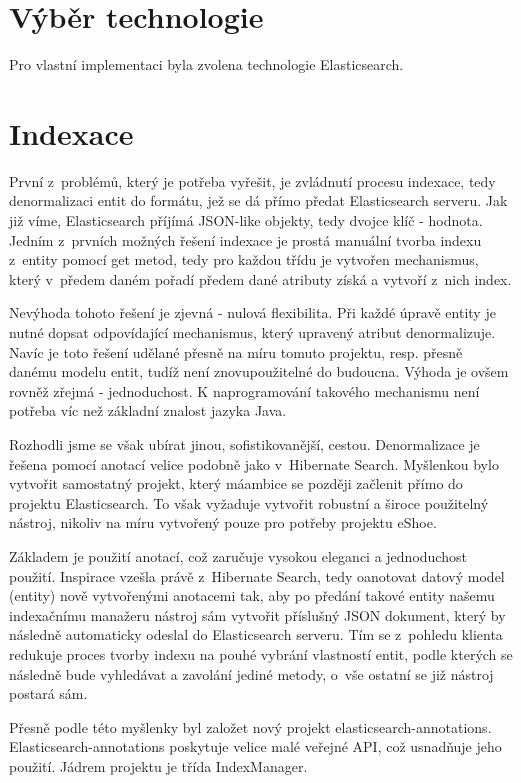 \documentclass[11pt,oneside]{fithesis2}
\begin{document}
\section{Výběr technologie}
Pro vlastní implementaci byla zvolena technologie Elasticsearch. 

\section{Indexace}
První z~problémů, který je potřeba vyřešit, je zvládnutí procesu indexace, tedy denormalizaci entit do formátu, jež se dá přímo předat Elasticsearch serveru. Jak již víme, Elasticsearch příjímá JSON-like objekty,
tedy dvojce klíč - hodnota.
Jedním z~prvních možných řešení indexace je prostá manuální tvorba indexu z~entity pomocí get metod, tedy pro každou třídu je vytvořen mechanismus, který v~předem daném pořadí předem dané atributy získá a vytvoří z~nich index.

Nevýhoda tohoto řešení je zjevná - nulová flexibilita. Při každé úpravě entity je nutné dopsat odpovídající mechanismus, který upravený atribut denormalizuje. Navíc je toto řešení udělané přesně na míru tomuto projektu, resp. přesně danému modelu entit,
tudíž není znovupoužitelné do budoucna. Výhoda je ovšem rovněž zřejmá - jednoduchost. K naprogramování takového mechanismu není potřeba víc než základní znalost jazyka Java.

Rozhodli jsme se však ubírat jinou, sofistikovanější, cestou. Denormalizace je řešena pomocí anotací velice podobně jako v~Hibernate Search. Myšlenkou bylo vytvořit samostatný projekt, který máambice se později začlenit přímo do projektu
Elasticsearch. To však vyžaduje vytvořit robustní a široce použitelný nástroj, nikoliv na míru vytvořený pouze pro potřeby projektu eShoe. 

Základem je použití anotací, což zaručuje vysokou eleganci a jednoduchost použití. Inspirace vzešla právě z~Hibernate Search, tedy oanotovat datový model (entity) nově vytvořenými anotacemi tak, aby po předání takové entity našemu indexačnímu manažeru
nástroj sám vytvořit příslušný JSON dokument, který by následně automaticky odeslal do Elasticsearch serveru. Tím se z~pohledu klienta redukuje proces tvorby indexu na pouhé vybrání vlastností entit, podle kterých se následně bude vyhledávat a
zavolání jediné metody, o~vše ostatní se již nástroj postará sám.

Přesně podle této myšlenky byl založet nový projekt elasticsearch-annotations. Elasticsearch-annotations poskytuje velice malé veřejné API, což usnadňuje jeho použití. Jádrem projektu je třída IndexManager.
\end{document}

